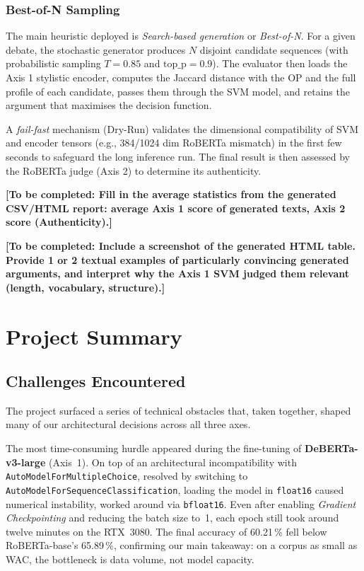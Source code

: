 \documentclass[11pt,a4paper]{article}
\begin{document}
\subsubsection{Best-of-N Sampling}
The main heuristic deployed is \textit{Search-based generation} or
\textit{Best-of-N}. For a given debate, the stochastic generator produces $N$
disjoint candidate sequences (with probabilistic sampling $T=0.85$ and
$\text{top\_p}=0.9$).
The evaluator then loads the Axis 1 stylistic encoder, computes the Jaccard
distance with the OP and the full profile of each candidate, passes them through
the SVM model, and retains the argument that maximises the decision function.

A \textit{fail-fast} mechanism (Dry-Run) validates the dimensional compatibility
of SVM and encoder tensors (e.g., 384/1024 dim RoBERTa mismatch) in the first
few seconds to safeguard the long inference run. The final result is then
assessed by the RoBERTa judge (Axis 2) to determine its authenticity.

\vspace{0.5cm}
\begin{tcolorbox}[colback=blue!5!white,colframe=blue!75!black,title=Axis 3 Experimental Results]
\textbf{[To be completed: Fill in the average statistics from the generated CSV/HTML report: average Axis 1 score of generated texts, Axis 2 score (Authenticity).]}

\textbf{[To be completed: Include a screenshot of the generated HTML table. Provide 1 or 2 textual examples of particularly convincing generated arguments, and interpret why the Axis 1 SVM judged them relevant (length, vocabulary, structure).]}
\end{tcolorbox}


\section{Project Summary}

\subsection{Challenges Encountered}

The project surfaced a series of technical obstacles that, taken together,
shaped many of our architectural decisions across all three axes.

The most time-consuming hurdle appeared during the fine-tuning of
\textbf{DeBERTa-v3-large} (Axis~1). On top of an architectural incompatibility
with \texttt{AutoModelForMultipleChoice}, resolved by switching to
\texttt{AutoModelForSequenceClassification}, loading the model in
\texttt{float16} caused numerical instability, worked around via
\texttt{bfloat16}. Even after enabling \textit{Gradient Checkpointing} and
reducing the batch size to~1, each epoch still took around twelve minutes on
the RTX~3080. The final accuracy of 60.21\,\% fell below RoBERTa-base's
65.89\,\%, confirming our main takeaway: on a corpus as small as WAC,
the bottleneck is data volume, not model capacity.
\end{document}
